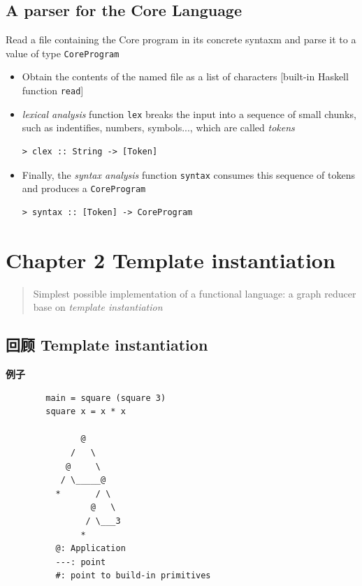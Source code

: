 \documentclass [11pt, a4paper]{article}
\begin{document}
\begin{flushleft}
    \subsection{A parser for the Core Language}
    Read a file containing the Core program in its concrete syntaxm and parse it to a value of type \texttt{CoreProgram}
    \begin{itemize}
        \item Obtain the contents of the named file as a list of characters [built-in Haskell function \texttt{read}]
        \item \emph{lexical analysis} function \texttt{lex} breaks the input into a sequence of small chunks,
        such as indentifies, numbers, symbols..., which are called \emph{tokens}
        \begin{verbatim}
> clex :: String -> [Token]
        \end{verbatim}
        \item Finally, the \emph{syntax analysis} function \texttt{syntax} consumes this sequence of tokens and 
        produces a \texttt{CoreProgram}
        \begin{verbatim}
> syntax :: [Token] -> CoreProgram     
        \end{verbatim}
    \end{itemize}

    \newpage
    \section{Chapter 2 Template instantiation}
    \begin{quotation}
        Simplest possible implementation of a functional language:
        a graph reducer base on \emph{template instantiation}
    \end{quotation}

\begin{CJK*}{UTF8}{song}
    \subsection{回顾 Template instantiation}
    \textbf{例子}
    \begin{verbatim}
        main = square (square 3)
        square x = x * x 

               @
             /   \
            @     \
           / \_____@
          *       / \
                 @   \
                / \___3
               *
          @: Application 
          ---: point
          #: point to build-in primitives
    \end{verbatim}


\end{CJK*}
\end{flushleft}
\end{document}
